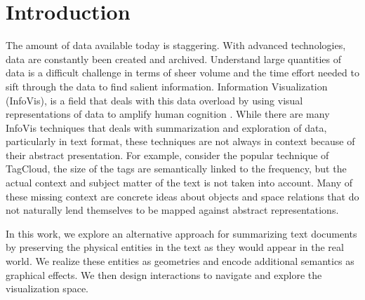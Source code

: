 \chapter{Introduction}
The amount of data available today is staggering. With advanced technologies,
data are constantly been created and archived. Understand large quantities of data is
a difficult challenge in terms of sheer volume and the time effort needed to
sift through the data to find salient information. Information Visualization
(InfoVis), is a field that deals with this data overload by using visual
representations of data to amplify human cognition \cite{Card1999}. While there
are many InfoVis techniques that deals with summarization and exploration of
data, particularly in text format, these techniques are not always in context
because of their abstract presentation. For example, consider the popular
technique of TagCloud, the size of the tags are semantically linked to the
frequency, but the actual context and subject matter of the text is not taken
into account. Many of these missing context are concrete ideas about objects and
space relations that do not naturally lend themselves to be mapped against
abstract representations.
 
In this work, we explore an alternative approach for summarizing text documents
by preserving the physical entities in the text as they would appear in the real
world. We realize these entities as \threed geometries and encode additional
semantics as graphical effects. We then design interactions to navigate and
explore the \threed visualization space.

 
